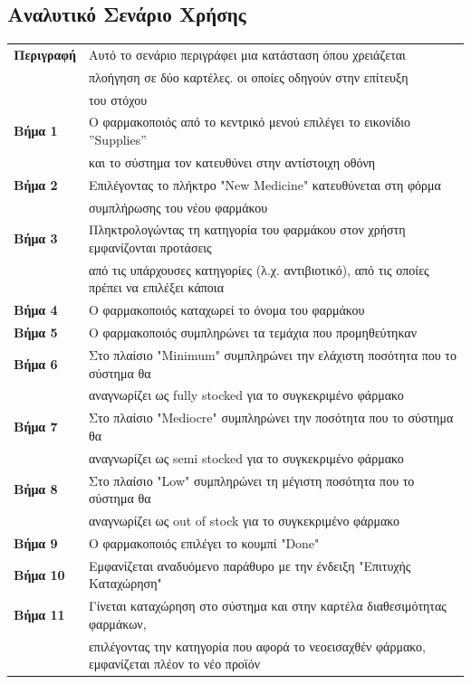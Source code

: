 \documentclass{article}
\newcommand\T{\rule{0pt}{2.6ex}}       %
\newcommand\B{\rule[-1.2ex]{0pt}{0pt}}
\begin{document}
 \subsection{Αναλυτικό Σενάριο Χρήσης}
 
 \begin{center}
     \begin{tabular}{|l|l|}
     \hline
      \textbf{Περιγραφή} & Αυτό το σενάριο περιγράφει μια κατάσταση όπου χρειάζεται \T \\& πλοήγηση σε δύο καρτέλες. οι οποίες οδηγούν στην επίτευξη \\& του στόχου \B \\ 
      \hline
      \textbf{Βήμα 1} & Ο φαρμακοποιός από το κεντρικό μενού επιλέγει το εικονίδιο ”Supplies” \T \\& και το σύστημα τον κατευθύνει στην αντίστοιχη οθόνη\\
      \hline
      \textbf{Βήμα 2} & Επιλέγοντας το πλήκτρο "New Medicine" κατευθύνεται στη φόρμα \T \\& συμπλήρωσης του νέου φαρμάκου \B \\
      \hline
      \textbf{Βήμα 3} & Πληκτρολογώντας τη κατηγορία του φαρμάκου στον χρήστη εμφανίζονται προτάσεις \T \\& από τις υπάρχουσες κατηγορίες (λ.χ. αντιβιοτικό), από τις οποίες πρέπει να επιλέξει κάποια \B \\
      \hline
      \textbf{Βήμα 4} & Ο φαρμακοποιός καταχωρεί το όνομα του φαρμάκου \T\B \\
      \hline
      \textbf{Βήμα 5} &  Ο φαρμακοποιός συμπληρώνει τα τεμάχια που προμηθεύτηκαν \T\B \\
      \hline
      \textbf{Βήμα 6} & Στο πλαίσιο "Minimum" συμπληρώνει την ελάχιστη ποσότητα που το σύστημα θα \T \\& αναγνωρίζει ως fully stocked για το συγκεκριμένο φάρμακο \B \\
      \hline
      \textbf{Βήμα 7} & Στο πλαίσιο "Mediocre" συμπληρώνει την ποσότητα που το σύστημα θα \T \\& αναγνωρίζει ως semi stocked για το συγκεκριμένο φάρμακο\\
      \hline
      \textbf{Βήμα 8} & Στο πλαίσιο "Low" συμπληρώνει τη μέγιστη ποσότητα που το σύστημα θα \T \\& αναγνωρίζει ως out of stock για το συγκεκριμένο φάρμακο \B \\
      \hline
      \textbf{Βήμα 9} & Ο φαρμακοποιός επιλέγει το κουμπί "Done" \T\B \\
      \hline
      \textbf{Βήμα 10} & Εμφανίζεται αναδυόμενο παράθυρο με την ένδειξη "Επιτυχής Καταχώρηση" \T\B \\
      \hline    
      \textbf{Βήμα 11} & Γίνεται καταχώρηση στο σύστημα και στην καρτέλα διαθεσιμότητας φαρμάκων, \T \\& επιλέγοντας την κατηγορία  που αφορά το νεοεισαχθέν φάρμακο, εμφανίζεται πλέον το νέο προϊόν \B \\
      \hline
     \end{tabular}
 \end{center}
 
\end{document}
